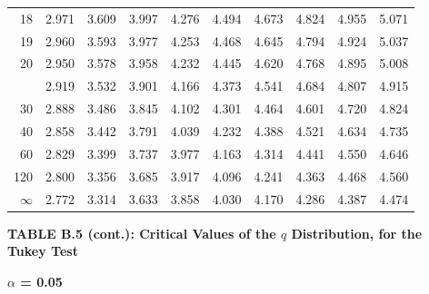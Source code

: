 \documentclass[10pt]{article}
\begin{document}
\begin{longtable}{@{}r!{\vrule width 0.8pt\hspace{0.55em}}rrrrrrrrr@{}}
18 & 2.971 & 3.609 & 3.997 & 4.276 & 4.494 & 4.673 & 4.824 & 4.955 & 5.071 \\
19 & 2.960 & 3.593 & 3.977 & 4.253 & 4.468 & 4.645 & 4.794 & 4.924 & 5.037 \\
20 & 2.950 & 3.578 & 3.958 & 4.232 & 4.445 & 4.620 & 4.768 & 4.895 & 5.008 \\
 & 2.919 & 3.532 & 3.901 & 4.166 & 4.373 & 4.541 & 4.684 & 4.807 & 4.915 \\
30 & 2.888 & 3.486 & 3.845 & 4.102 & 4.301 & 4.464 & 4.601 & 4.720 & 4.824 \\
40 & 2.858 & 3.442 & 3.791 & 4.039 & 4.232 & 4.388 & 4.521 & 4.634 & 4.735 \\
60 & 2.829 & 3.399 & 3.737 & 3.977 & 4.163 & 4.314 & 4.441 & 4.550 & 4.646 \\
120 & 2.800 & 3.356 & 3.685 & 3.917 & 4.096 & 4.241 & 4.363 & 4.468 & 4.560 \\
\addlinespace[0.30em]
$\infty$ & 2.772 & 3.314 & 3.633 & 3.858 & 4.030 & 4.170 & 4.286 & 4.387 & 4.474 \\
\end{longtable}
\newpage
\thispagestyle{empty}
\begin{center}
{\large\bfseries TABLE B.5 (cont.): Critical Values of the $q$ Distribution, for the Tukey Test\par}
\end{center}
{\large\bfseries $\alpha$ = 0.05\par}
\vspace{0.45em}
\small
\end{document}
